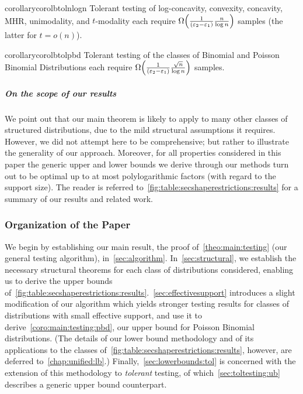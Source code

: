 \begin{restatable}{corollary}{corolbtolnlogn}\label{coro:tol:lb:nlogn}
  Tolerant testing of log-concavity, convexity, concavity, MHR, unimodality, and $t$-modality each require $\bigOmega{\frac{1}{(\eps_2-\eps_1)}\frac{n}{\log n}}$ samples (the latter for $t = o(n)$).
\end{restatable}

\begin{restatable}{corollary}{corolbtolpbd}\label{coro:lb:tol:pbd}
  Tolerant testing of the classes of Binomial and Poisson Binomial Distributions each require $\bigOmega{\frac{1}{(\eps_2-\eps_1)}\frac{\sqrt{n}}{\log n}}$ samples.
\end{restatable}

\subparagraph{On the scope of our results} We point out that our main theorem is likely to apply to many other classes of structured distributions, 
due to the mild structural assumptions it requires. However, we did not attempt here to be comprehensive; but rather to illustrate the generality of our approach. Moreover, for all properties considered in this paper the generic upper and lower bounds we derive through our methods turn out to be optimal up to at most polylogarithmic factors (with regard to the support size). The reader is referred to~\cref{fig:table:secshaperestrictions:results} for a summary of our results and related work.

\subsubsection{Organization of the Paper}
We begin by establishing our main result, the proof of~\cref{theo:main:testing} (our general testing algorithm), in~\cref{sec:algorithm}. 
In~\cref{sec:structural}, we establish the necessary structural theorems for each class of distributions considered, enabling us to derive the upper bounds of~\cref{fig:table:secshaperestrictions:results}.~\cref{sec:effectivesupport} introduces a slight modification of our algorithm which yields stronger testing results for classes of distributions with small effective support, and use it to derive~\cref{coro:main:testing:pbd}, our upper bound for Poisson Binomial distributions. (The details of our lower bound methodology and of its applications to the classes of~\cref{fig:table:secshaperestrictions:results}, however, are deferred to~\cref{chap:unified:lb}.) Finally,~\cref{sec:lowerbounds:tol} is concerned with the extension of this methodology to \emph{tolerant} testing, of which~\cref{sec:toltesting:ub} describes a generic upper bound counterpart.
 

